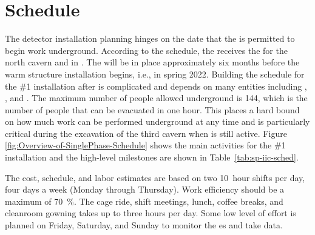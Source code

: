 \section{Schedule}
\label{sec:sp-inst-sched}

The detector installation planning hinges on the date that the  is permitted to begin work underground. According to the   schedule, the  receives the  for  the north cavern and  in \cucbenocc{}.  The   will be in place approximately six months before the warm structure installation begins, i.e., in spring 2022. Building the schedule for the  \#1 installation after  is  complicated and depends on many entities including , , and .  The maximum number of people allowed underground is 144, which is the number of people that can be evacuated in one hour.  This places a hard bound on how much work can be performed underground at any time and is particularly critical during the excavation of the third cavern when  is still active. Figure \ref{fig:Overview-of-SinglePhase-Schedule} shows the main activities for the  \#1 installation and  the high-level milestones are shown in Table~\ref{tab:sp-iic-sched}.

The cost, schedule, and labor estimates are based on two \SI{10}{hour} shifts per day, four days a week (Monday through Thursday). Work efficiency should be a maximum of \SI{70}{\%}.  The cage ride, shift meetings, lunch, coffee breaks, and cleanroom gowning takes %
up to three hours per day. Some low level of effort is planned on Friday, Saturday, and Sunday to monitor the \coldbox{}es and take data. 

